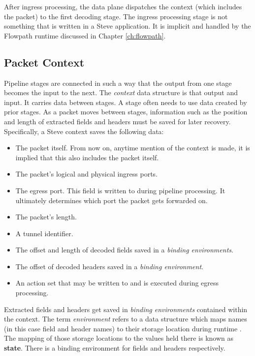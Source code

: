 After ingress processing, the data plane dispatches the context (which includes
the packet) to the first decoding stage. The ingress processing stage is not
something that is written in a Steve application. It is implicit and handled by
the Flowpath runtime discussed in Chapter \ref{ch:flowpath}.

\subsection{Packet Context} \label{context_desc}

Pipeline stages are connected in such a way that the output from one stage
becomes the input to the next. The \textit{context} data structure is that
output and input. It carries data between stages. A stage often needs to use
data created by prior stages. As a packet moves between stages, information such
as the position and length of extracted fields and headers must be saved for
later recovery. Specifically, a Steve context saves the following data:

\begin{itemize} \item The packet itself. From now on, anytime mention of the
context is made, it is implied that this also includes the packet itself. \item
The packet's logical and physical ingress ports. \item The egress port. This
field is written to during pipeline processing. It ultimately determines which
port the packet gets forwarded on. \item The packet's length. \item A tunnel
identifier. \item The offset and length of decoded fields saved in a
\textit{binding environments}. \item The offset of decoded headers saved in a
\textit{binding environment}. \item An action set that may be written to and is
executed during egress processing. \end{itemize}

Extracted fields and headers get saved in \textit{binding environments}
contained within the context. The term \textit{environment} refers to a data
structure which maps names (in this case field and header names) to their
storage location during runtime \cite{compilers1}. The mapping of those storage
locations to the values held there is known as \textbf{state}. There is a
binding environment for fields and headers respectively.

